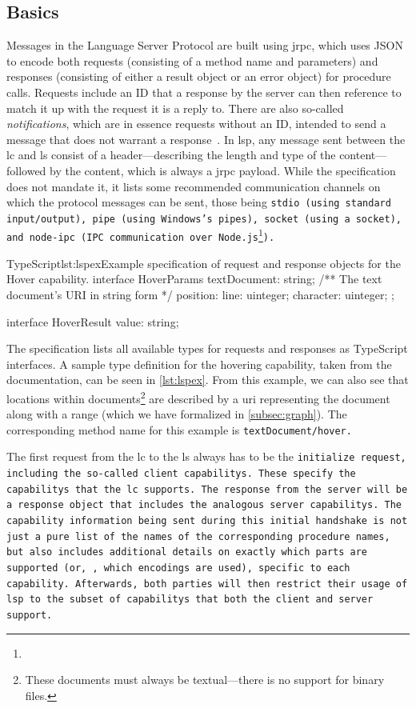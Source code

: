 \documentclass[../thesis]{subfiles}
\begin{document}
\subsection{Basics}\label{subsec:lspbasics}
Messages in the Language Server Protocol are built using \gls{jrpc}, which uses JSON to encode both requests (consisting of a method name and parameters) and responses (consisting of either a result object or an error object) for procedure calls.
Requests include an ID that a response by the server can then reference to match it up with the request it is a reply to.
There are also so-called \emph{notifications}, which are in essence requests without an ID, intended to send a message that does not warrant a response~\cite{jsonrpc,json}.
In \gls{lsp}, any message sent between the \gls{lc} and \gls{ls} consist of a header---describing the length and type of the content---followed by the content, which is always a \gls{jrpc} payload.
While the specification does not mandate it, it lists some recommended communication channels on which the protocol messages can be sent, those being \tt{stdio} (using standard input/output), \tt{pipe} (using Windows's pipes), \tt{socket} (using a socket), and \tt{node-ipc} (IPC communication over Node.js\footnote{}).

\begin{codebox}{TypeScript}{lst:lspex}{Example specification of request and response objects for the Hover {capability}.}
interface HoverParams {
  textDocument: string; /** The text document's URI in string form */
  position: { line: uinteger; character: uinteger; };
}

interface HoverResult {
  value: string;
}
\end{codebox}\label{lst:lspex}

The specification lists all available types for requests and responses as TypeScript interfaces.
A sample type definition for the hovering \gls{capability}, taken from the documentation, can be seen in \cref{lst:lspex}.
From this example, we can also see that locations within documents\footnote{
	These documents must always be textual---there is no support for binary files.
} are described by a \gls*{uri} representing the document along with a \gls{range} (which we have formalized in \cref{subsec:graph}).
The corresponding method name for this example is \tt{textDocument/hover}.

The first request from the \gls{lc} to the \gls{ls} always has to be the \tt{initialize} request, including the so-called client \glspl{capability}.
These specify the \glspl{capability} that the \gls{lc} supports.
The response from the server will be a response object that includes the analogous server \glspl{capability}.
The \gls{capability} information being sent during this initial handshake is not just a pure list of the names of the corresponding procedure names, but also includes additional details on exactly which parts are supported (or, \eg, which encodings are used), specific to each \gls{capability}.
Afterwards, both parties will then restrict their usage of \gls{lsp} to the subset of \glspl{capability} that both the client and server support.
\end{document}

